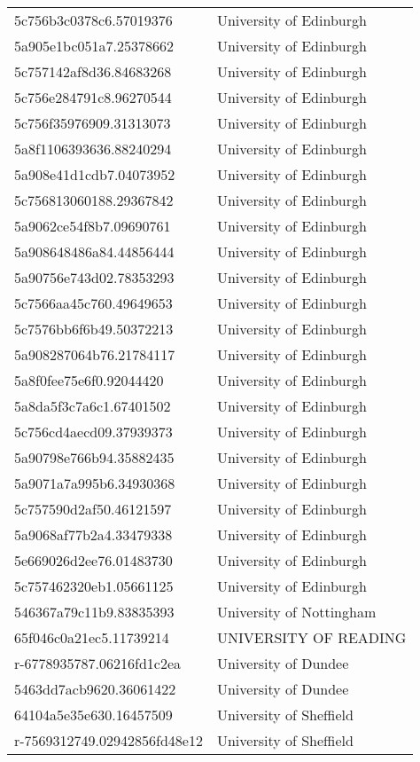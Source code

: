 \begin{tabular}{ll}
5c756b3c0378c6.57019376 & University of Edinburgh \\
5a905e1bc051a7.25378662 & University of Edinburgh \\
5c757142af8d36.84683268 & University of Edinburgh \\
5c756e284791c8.96270544 & University of Edinburgh \\
5c756f35976909.31313073 & University of Edinburgh \\
5a8f1106393636.88240294 & University of Edinburgh \\
5a908e41d1cdb7.04073952 & University of Edinburgh \\
5c756813060188.29367842 & University of Edinburgh \\
5a9062ce54f8b7.09690761 & University of Edinburgh \\
5a908648486a84.44856444 & University of Edinburgh \\
5a90756e743d02.78353293 & University of Edinburgh \\
5c7566aa45c760.49649653 & University of Edinburgh \\
5c7576bb6f6b49.50372213 & University of Edinburgh \\
5a908287064b76.21784117 & University of Edinburgh \\
5a8f0fee75e6f0.92044420 & University of Edinburgh \\
5a8da5f3c7a6c1.67401502 & University of Edinburgh \\
5c756cd4aecd09.37939373 & University of Edinburgh \\
5a90798e766b94.35882435 & University of Edinburgh \\
5a9071a7a995b6.34930368 & University of Edinburgh \\
5c757590d2af50.46121597 & University of Edinburgh \\
5a9068af77b2a4.33479338 & University of Edinburgh \\
5e669026d2ee76.01483730 & University of Edinburgh \\
5c757462320eb1.05661125 & University of Edinburgh \\
546367a79c11b9.83835393 & University of Nottingham \\
65f046c0a21ec5.11739214 & UNIVERSITY OF READING \\
r-6778935787.06216fd1c2ea & University of Dundee \\
5463dd7acb9620.36061422 & University of Dundee \\
64104a5e35e630.16457509 & University of Sheffield \\
r-7569312749.02942856fd48e12 & University of Sheffield \\

\end{tabular}

